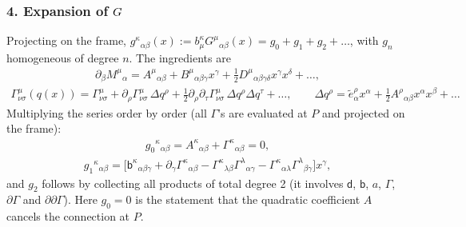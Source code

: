 \documentclass[letterpaper,10pt,english]{jupyterBook}
\begin{document}
\subsubsection{4. Expansion of \protect\(G\protect\)}
\label{\detokenize{ch/relativity-general/geodesics-linearization:expansion-of-g}}
\sphinxAtStartPar
Projecting on the frame, \(g^\kappa{}_{\alpha\beta}(x):=b^\kappa_\mu G^\mu{}_{\alpha\beta}(x)=g_0+g_1+g_2+\dots\), with \(g_n\) homogeneous of degree \(n\). The ingredients are
\begin{equation*}
\begin{split}
\partial_\beta M^\mu{}_\alpha=A^\mu{}_{\alpha\beta}+B^\mu{}_{\alpha\beta\gamma}x^\gamma+\tfrac12D^\mu{}_{\alpha\beta\gamma\delta}x^\gamma x^\delta+\dots,
\end{split}
\end{equation*}\begin{equation*}
\begin{split}
\Gamma^\mu_{\nu\sigma}(q(x))=\Gamma^\mu_{\nu\sigma}+\partial_\rho\Gamma^\mu_{\nu\sigma}\,\Delta q^\rho+\tfrac12\partial_\rho\partial_\tau\Gamma^\mu_{\nu\sigma}\,\Delta q^\rho\Delta q^\tau+\dots,\qquad
\Delta q^\rho=\tilde e^\rho_\alpha x^\alpha+\tfrac12A^\rho{}_{\alpha\beta}x^\alpha x^\beta+\dots
\end{split}
\end{equation*}
\sphinxAtStartPar
Multiplying the series order by order (all \(\Gamma\)’s are evaluated at \(P\) and projected on the frame):
\begin{equation*}
\begin{split}
g_0{}^\kappa{}_{\alpha\beta}=A^\kappa{}_{\alpha\beta}+\Gamma^\kappa{}_{\alpha\beta}=0,
\end{split}
\end{equation*}\begin{equation*}
\begin{split}
g_1{}^\kappa{}_{\alpha\beta}=\Big[\mathsf b^\kappa{}_{\alpha\beta\gamma}+\partial_\gamma\Gamma^\kappa{}_{\alpha\beta}-\Gamma^\kappa{}_{\lambda\beta}\Gamma^\lambda{}_{\alpha\gamma}-\Gamma^\kappa{}_{\alpha\lambda}\Gamma^\lambda{}_{\beta\gamma}\Big]x^\gamma,
\end{split}
\end{equation*}
\sphinxAtStartPar
and \(g_2\) follows by collecting all products of total degree 2 (it involves \(\mathsf d\), \(\mathsf b\), \(a\), \(\Gamma\), \(\partial\Gamma\) and \(\partial\partial\Gamma\)). Here \(g_0=0\) is the statement that the quadratic coefficient \(A\) cancels the connection at \(P\).
\end{document}
